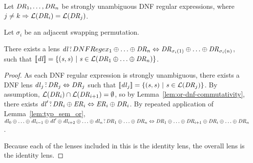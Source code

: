 \documentclass[numbers,10pt,preprint\ifanon ,nocopyrightspace\fi]{sigplanconf}
\begin{document}
\begin{lemma}
  \label{lem:adj-swap-or}
  Let $\mathit{DR}_1,\ldots,\mathit{DR}_n$ be strongly unambiguous DNF regular
  expressions, where $j \neq k \Rightarrow
  \mathcal{L}(\mathit{DR}_i) = \mathcal{L}(\mathit{DR}_j)$.

  Let $\sigma_i$ be an adjacent swapping permutation.

  There exists a lens $\mathit{dl} \,\tilde{:}\, DNFRegex_1 \oplus \ldots
  \oplus \mathit{DR}_n \Leftrightarrow \mathit{DR}_{\sigma_i(1)} \oplus \ldots
  \oplus \mathit{DR}_{\sigma_i(n)}$, such that $[ \! [\mathit{dl}] \! ] =
  \{(\mathit{s},\mathit{s}) ~|~ \mathit{s} \in \mathcal{L}(\mathit{DR}_1 \oplus
      \ldots \oplus \mathit{DR}_n)\}$.
\end{lemma}
\begin{proof}
  As each DNF regular expression is strongly unambiguous, there exists a DNF
  lens $\mathit{dl}_j \,\tilde{:}\, \mathit{DR}_j \Leftrightarrow \mathit{DR}_j$
  such that $[ \! [\mathit{dl}_j] \! ] = \{(\mathit{s},\mathit{s}) ~|~
    \mathit{s} \in \mathcal{L}(\mathit{DR}_j)\}$.
  By assumption, $\mathcal{L}(\mathit{DR}_i) \cap \mathcal{L}(\mathit{DR}_{i+1}) = \emptyset$, so by
  Lemma~\ref{lem:or-dnf-commutativity},
  there exists $\mathit{dl}' \,\tilde{:}\, \mathit{DR}_i \oplus \mathit{ER}_i
  \Leftrightarrow \mathit{ER}_i \oplus \mathit{DR}_i$.  By repeated application of
  Lemma~\ref{lem:typ_sem_or},
  $\mathit{dl}_0 \oplus \ldots \oplus \mathit{dl}_{i-1} \oplus \mathit{dl}' \oplus
  \mathit{dl}_{i+2} \oplus \ldots \oplus \mathit{dl}_n \,\tilde{:}\,
  \mathit{DR}_1 \oplus \ldots \oplus \mathit{DR}_n
  \Leftrightarrow
  \mathit{DR}_1 \oplus \ldots \oplus \mathit{DR}_{i+1} \oplus \mathit{DR}_i \oplus
  \ldots \oplus \mathit{DR}_n$.

  Because each of the lenses included in this is the identity lens, the overall
  lens is the identity lens.
\end{proof}
\end{document}
